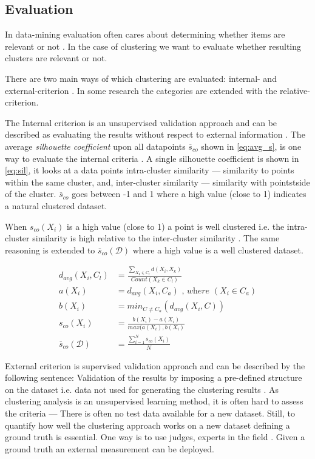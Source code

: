 \documentclass[a4paper,11pt]{article}
\begin{document}
\subsection{Evaluation}
In data-mining evaluation often cares about determining whether items are relevant or not \cite{manning2010introduction}. In the case of clustering we want to evaluate whether resulting clusters are relevant or not.

There are two main ways of which clustering are evaluated: internal- and external-criterion \cite{manning2010introduction}
. In some research the categories are extended with the relative-criterion.\cite{Halkidi2002}

The Internal criterion is an unsupervised validation approach and can be described as evaluating the results without respect to external information \cite{Halkidi2002}. The average \textit{silhouette coefficient} upon all datapoints $\overline{s}_{co}$ shown in \ref{eq:avg_s}, is one way to evaluate the internal criteria \cite{ROUSSEEUW198753}. A single silhouette coefficient is shown in \ref{eq:sil}, it looks at a data points intra-cluster similarity --- similarity to points within the same cluster, and, inter-cluster similarity --- similarity with pointstside of the cluster. $\overline{s}_{co}$ goes between -1 and 1 where a high value (close to 1) indicates a natural clustered dataset.

When $s_{co}(X_i)$ is a high value (close to 1) a point is well clustered i.e. the intra-cluster similarity is high relative to the inter-cluster similarity \cite{ROUSSEEUW198753}. The same reasoning is extended to $\overline{s}_{co}(\mathcal{D})$ where a high value is a well clustered dataset.

\begin{align}
  d_{avg}(X_i,C_l) &= \frac{\sum_{X_k \in C_l}d(X_i,X_k)}{Count(X_k \in C_l)} \\
  a(X_i) &= d_{avg}(X_i,C_a) \textit{ , where } (X_i \in C_a) \\
  b(X_i) &= min_{C \neq C_a}(d_{avg}(X_i,C)) \\
 \label{eq:sil}
  s_{co}(X_i) &= \frac{b(X_i) - a(X_i)}{max(a(X_i), b(X_i)} \\
\label{eq:avg_s}
  \overline{s}_{co}(\mathcal{D}) &= \frac{\sum^{N}_{i=1} s_{co}(X_i)}{N}
\end{align}

External criterion is supervised validation approach and can be described by the following sentence: Validation of the results by imposing a pre-defined structure on the dataset i.e. data not used for generating the clustering results \cite{Halkidi2002}. As clustering analysis is an unsupervised learning method, it is often hard to assess the criteria --- There is often no test data available for a new dataset. Still, to quantify how well the clustering approach works on a new dataset defining a ground truth is essential. One way is to use judges, experts in the field \cite{manning2010introduction}. Given a ground truth an external measurement can be deployed.
\end{document}
